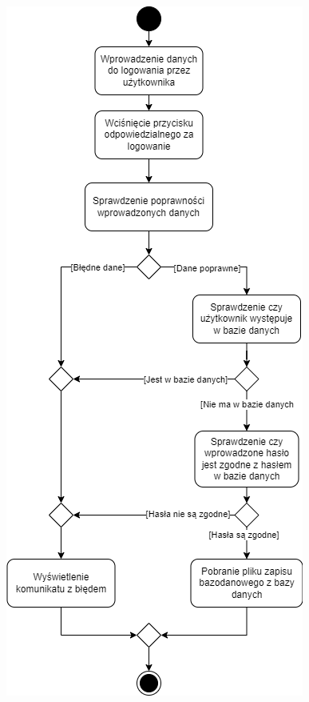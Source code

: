 \documentclass[12pt,a4paper]{article} %
\begin{document}
\begin{figure}
	\centering
	\begin{minipage}{.5\textwidth}
	  \centering
	  \includegraphics[width=.8\textwidth]{images/diagramy_czynnosci/plan-diagram_czynnosci_logowanie.png}
	  \label{rys:diagram_czynnosci_logowanie}
	\end{minipage}%

\end{figure}
\end{document}
